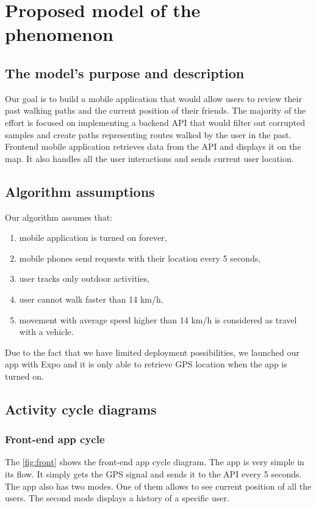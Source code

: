 \chapter{Proposed model of the phenomenon} \label{ch:model}

\section{The model's purpose and description}
Our goal is to build a mobile application that would allow users to review their past walking paths and the current position of their friends. The majority of the effort is focused on implementing a backend API that would filter out corrupted samples and create paths representing routes walked by the user in the past. Frontend mobile application retrieves data from the API and displays it on the map. It also handles all the user interactions and sends current user location.

\section{Algorithm assumptions}
Our algorithm assumes that:
\begin{enumerate}
    \item mobile application is turned on forever,
    \item mobile phones send requests with their location every 5 seconds,
    \item user tracks only outdoor activities,
    \item user cannot walk faster than 14 km/h.
    \item movement with average speed higher than 14 km/h is considered as travel with a vehicle.
\end{enumerate}

Due to the fact that we have limited deployment possibilities, we launched our app with Expo and it is only able to retrieve GPS location when the app is turned on.

\section{Activity cycle diagrams}

\subsection{Front-end app cycle}
The \ref{fig:front} shows the front-end app cycle diagram. The app is very simple in its flow. It simply gets the GPS signal and sends it to the API every 5 seconds. The app also has two modes. One of them allows to see current position of all the users. The second mode displays a history of a specific user.

